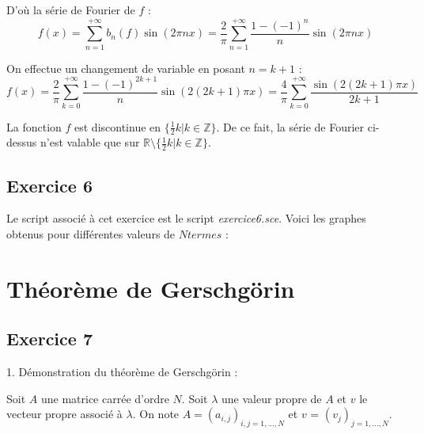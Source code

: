 \documentclass[a4paper,11pt]{article}
\begin{document}
	D'où la série de Fourier de $f$ :
	\begin{equation*}
		f(x) = \sum_{n=1}^{+ \infty} b_{n}(f) \sin (2 \pi n x) = \frac{2}{\pi} \sum_{n=1}^{+ \infty} \frac{1-(-1)^{n}}{n} \sin (2 \pi n x)
	\end{equation*}

	On effectue un changement de variable en posant $n=k+1$ :
	\begin{equation*}
		f(x) =  \frac{2}{\pi} \sum_{k=0}^{+ \infty} \frac{1-(-1)^{2k+1}}{n} \sin (2 (2k+1) \pi x)
		= \frac{4}{\pi} \sum_{k=0}^{+ \infty} \frac{\sin (2 (2k+1) \pi x)}{2k+1}
	\end{equation*}
	
	La fonction $f$ est discontinue en $\{\frac{1}{2} k | k \in \mathbb{Z}\}$. De ce fait, la série de Fourier ci-dessus n'est valable que sur $\mathbb{R} \setminus \{\frac{1}{2} k | k \in \mathbb{Z}\}$.

\subsection*{Exercice 6}
	Le script associé à cet exercice est le script \textit{exercice6.sce}. Voici les graphes obtenus pour différentes valeurs de $Ntermes$ :
	

\section{Théorème de Gerschgörin}

\subsection*{Exercice 7}

	1. Démonstration du théorème de Gerschgörin :

	Soit $A$ une matrice carrée d'ordre $N$. Soit $\lambda$ une valeur propre de $A$ et $v$ le vecteur propre associé à $\lambda$. On note $A = (a_{i,j})_{i,j=1,...,N}$ et $v$ = $(v_{j})_{j=1,...,N}$.
\end{document}
